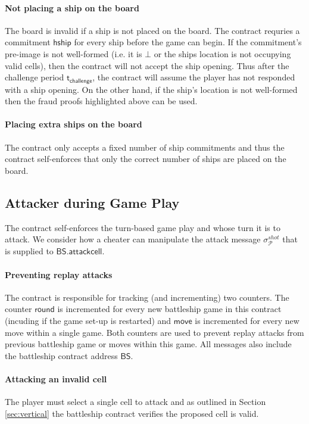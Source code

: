 \documentclass{llncs}
\newcommand{\hship}{\mathsf{hship}}
\newcommand{\participant}{\mathcal{P}}
\newcommand{\battleship}{\mathsf{BS}}
\newcommand{\battleshipattackcell}{\mathsf{BS.attackcell}}
\newcommand{\timechallenge}{\mathsf{t}_{\mathsf{challenge}}}
\begin{document}
	\paragraph{Not placing a ship on the board} 
	The board is invalid if a ship is not placed on the board. 
	The contract requries a commitment $\hship$ for every ship before the game can begin.
	If the commitment's pre-image is not well-formed (i.e. it is $\bot$ or the ships location is not occupying valid cells), then the contract will not accept the ship opening.
	Thus after the challenge period $\timechallenge$, the contract will assume the player has not responded with a ship opening.
	On the other hand, if the ship's location is not well-formed then the fraud proofs highlighted above can be used. 
	
	\paragraph{Placing extra ships on the board} 
	The contract only accepts a fixed number of ship commitments and thus the contract self-enforces that only the correct number of ships are placed on the board. 
	
	\subsection{Attacker during Game Play} 
	
	The contract self-enforces the turn-based game play and whose turn it is to attack.
	We consider how a cheater can manipulate the attack message $\sigma^{shot}_{\participant}$ that is supplied to $\battleshipattackcell$. 
	
	\paragraph{Preventing replay attacks}
	The contract is responsible for tracking (and incrementing) two counters. 
	The counter $\mathsf{round}$ is incremented for every new battleship game in this contract (incuding if the game set-up is restarted) and $\mathsf{move}$ is incremented for every new move within a single game. 
	Both counters are used to prevent replay attacks from previous battleship game or moves within this game. 
	All messages also include the battleship contract address $\battleship$.
	
	\paragraph{Attacking an invalid cell}
	The player must select a single cell to attack and as outlined in Section \ref{sec:vertical} the battleship contract verifies the proposed cell is valid. 
	
\end{document}
